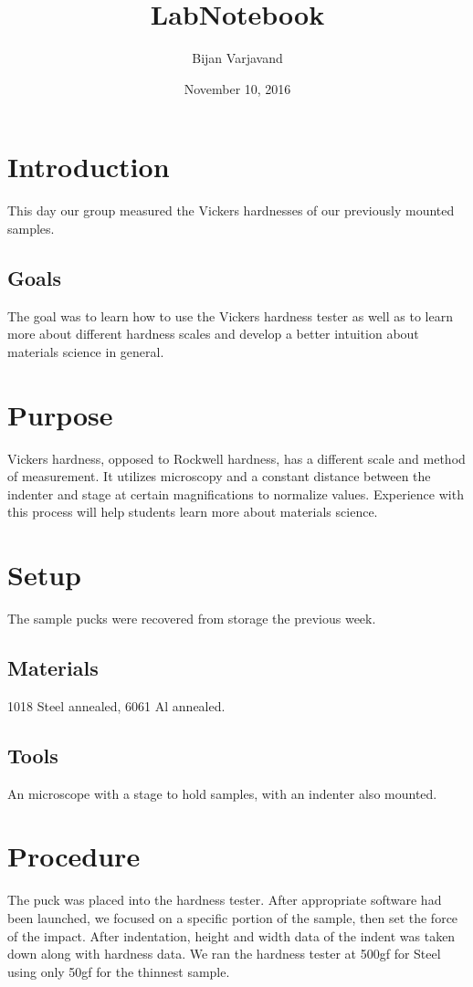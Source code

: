 \documentclass{article}
\author{Bijan Varjavand}
\title{LabNotebook}
\date{November 10, 2016}
\begin{document}
\maketitle

\section{Introduction}

This day our group measured the Vickers hardnesses of our previously mounted samples.
\subsection{Goals}

The goal was to learn how to use the Vickers hardness tester as well as to learn more about different hardness scales and develop a better intuition about materials science in general.
\section{Purpose}

Vickers hardness, opposed to Rockwell hardness, has a different scale and method of measurement. It utilizes microscopy and a constant distance between the indenter and stage at certain magnifications to normalize values. Experience with this process will help students learn more about materials science.
\section{Setup}

The sample pucks were recovered from storage the previous week.
\subsection{Materials}

1018 Steel annealed, 6061 Al annealed.
\subsection{Tools}

An microscope with a stage to hold samples, with an indenter also mounted.
\section{Procedure}

The puck was placed into the hardness tester. After appropriate software had been launched, we focused on a specific portion of the sample, then set the force of the impact. After indentation, height and width data of the indent was taken down along with hardness data. We ran the hardness tester at 500gf for Steel using only 50gf for the thinnest sample.
\end{document}

